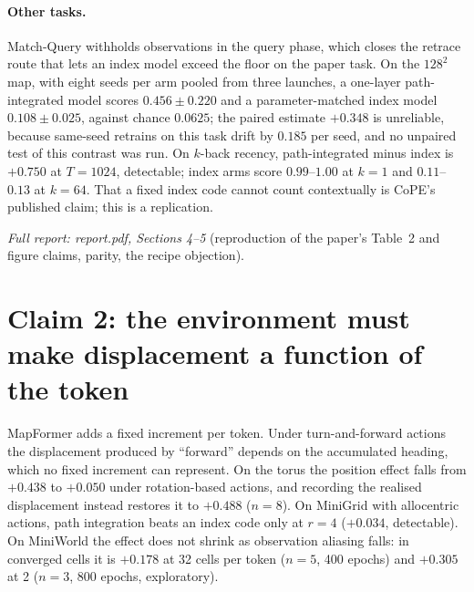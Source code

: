 \documentclass[10pt]{article}
\begin{document}
\paragraph{Other tasks.} Match-Query withholds observations in the query phase, which closes the retrace route that
lets an index model exceed the floor on the paper task. On the $128^2$ map, with eight seeds per arm pooled from
three launches, a one-layer path-integrated model scores
$0.456\pm0.220$ and a parameter-matched index model $0.108\pm0.025$, against chance $0.0625$; the paired estimate $+0.348$ is unreliable, because same-seed retrains on this task drift by $0.185$ per seed, and no
unpaired test of this contrast was run. On $k$-back recency, path-integrated minus index is $+0.750$ at
$T=1024$, detectable; index arms score $0.99$--$1.00$ at $k=1$ and $0.11$--$0.13$ at $k=64$. That a fixed
index code cannot count contextually is CoPE's published claim; this is a replication.

\noindent\emph{Full report: report.pdf, Sections 4--5} (reproduction of the paper's Table~2 and figure claims,
parity, the recipe objection).

\section{Claim 2: the environment must make displacement a function of the token}
\label{sec:claim2}

MapFormer adds a fixed increment per token. Under turn-and-forward actions the displacement produced by
``forward'' depends on the accumulated heading, which no fixed increment can represent. On the torus the position
effect falls from $+0.438$ to $+0.050$ under rotation-based actions, and recording the realised displacement
instead restores it to $+0.488$ ($n=8$). On MiniGrid with allocentric actions, path integration beats an index
code only at $r=4$ ($+0.034$, detectable). On MiniWorld the effect does not shrink as observation
aliasing falls: in converged cells it is $+0.178$ at 32 cells per token ($n=5$, 400 epochs) and $+0.305$ at 2
($n=3$, 800 epochs, exploratory).
\end{document}
